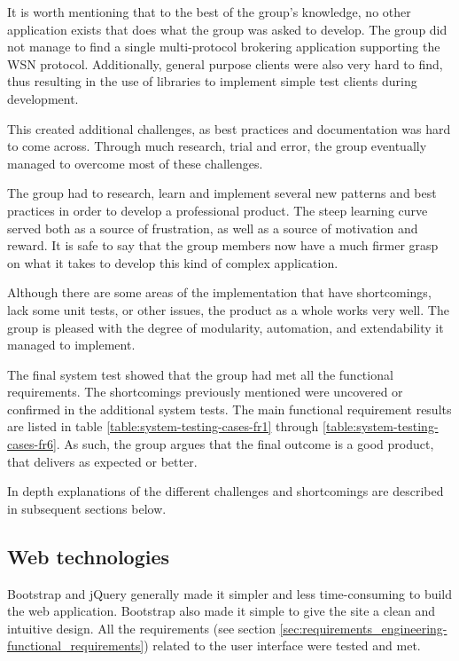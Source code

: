 It is worth mentioning that to the best of the group's knowledge, no other application exists that does what the group was asked to develop. The group did not manage to find a single multi-protocol brokering application supporting the WSN protocol. Additionally, general purpose clients were also very hard to find, thus resulting in the use of libraries to implement simple test clients during development.

This created additional challenges, as best practices and documentation was hard to come across. Through much research, trial and error, the group eventually managed to overcome most of these challenges.

The group had to research, learn and implement several new patterns and best practices in order to develop a professional product. The steep learning curve served both as a source of frustration, as well as a source of motivation and reward. It is safe to say that the group members now have a much firmer grasp on what it takes to develop this kind of complex application.

Although there are some areas of the implementation that have shortcomings, lack some unit tests, or other issues, the product as a whole works very well. The group is pleased with the degree of modularity, automation, and extendability it managed to implement.

The final system test showed that the group had met all the functional requirements. The shortcomings previously mentioned were uncovered or confirmed in the additional system tests. The main functional requirement results are listed in table \ref{table:system-testing-cases-fr1} through \ref{table:system-testing-cases-fr6}. As such, the group argues that the final outcome is a good product, that delivers as expected or better.

In depth explanations of the different challenges and shortcomings are described in subsequent sections below.

\subsection{Web technologies}
\label{subsec:Web_technologies}

Bootstrap and jQuery generally made it simpler and less time-consuming to build the web application. Bootstrap also made it simple to give the site a clean and intuitive design. All the requirements (see section \ref{sec:requirements_engineering-functional_requirements}) related to the user interface were tested and met.

